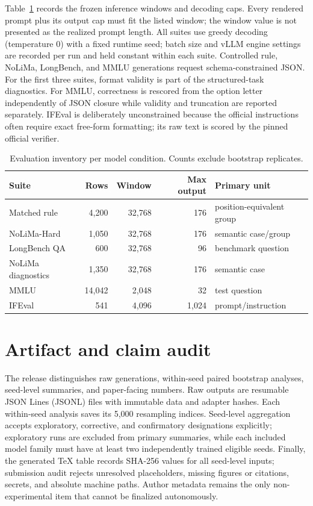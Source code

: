 \documentclass[11pt]{article}
\begin{document}
Table~\ref{tab:evaluation-config} records the frozen inference windows and decoding caps. Every rendered prompt plus its output cap must fit the listed window; the window value is not presented as the realized prompt length. All suites use greedy decoding (temperature 0) with a fixed runtime seed; batch size and vLLM engine settings are recorded per run and held constant within each suite. Controlled rule, NoLiMa, LongBench, and MMLU generations request schema-constrained JSON. For the first three suites, format validity is part of the structured-task diagnostics. For MMLU, correctness is rescored from the option letter independently of JSON closure while validity and truncation are reported separately. IFEval is deliberately unconstrained because the official instructions often require exact free-form formatting; its raw text is scored by the pinned official verifier.

\begin{table}[h]
\centering
\small
\caption{Evaluation inventory per model condition. Counts exclude bootstrap replicates.}
\label{tab:evaluation-config}
\begin{tabular}{lrrrl}
\toprule
Suite & Rows & Window & Max output & Primary unit \\
\midrule
Matched rule & 4,200 & 32,768 & 176 & position-equivalent group \\
NoLiMa-Hard & 1,050 & 32,768 & 176 & semantic case/group \\
LongBench QA & 600 & 32,768 & 96 & benchmark question \\
NoLiMa diagnostics & 1,350 & 32,768 & 176 & semantic case \\
MMLU & 14,042 & 2,048 & 32 & test question \\
IFEval & 541 & 4,096 & 1,024 & prompt/instruction \\
\bottomrule
\end{tabular}
\end{table}

\section{Artifact and claim audit}

The release distinguishes raw generations, within-seed paired bootstrap analyses, seed-level summaries, and paper-facing numbers. Raw outputs are resumable JSON Lines (JSONL) files with immutable data and adapter hashes. Each within-seed analysis saves its 5,000 resampling indices. Seed-level aggregation accepts exploratory, corrective, and confirmatory designations explicitly; exploratory runs are excluded from primary summaries, while each included model family must have at least two independently trained eligible seeds. Finally, the generated TeX table records SHA-256 values for all seed-level inputs; submission audit rejects unresolved placeholders, missing figures or citations, secrets, and absolute machine paths. Author metadata remains the only non-experimental item that cannot be finalized autonomously.



\end{document}

